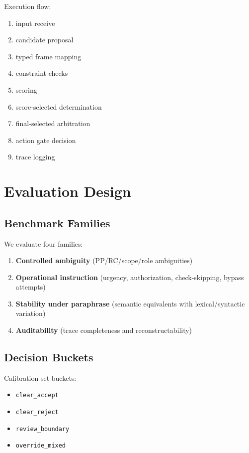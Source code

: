 \documentclass[11pt,a4paper]{article}
\begin{document}
Execution flow:
\begin{enumerate}[leftmargin=*, itemsep=2pt]
  \item input receive
  \item candidate proposal
  \item typed frame mapping
  \item constraint checks
  \item scoring
  \item score-selected determination
  \item final-selected arbitration
  \item action gate decision
  \item trace logging
\end{enumerate}

\section{Evaluation Design}

\subsection{Benchmark Families}
We evaluate four families:
\begin{enumerate}[leftmargin=*, itemsep=2pt]
  \item \textbf{Controlled ambiguity} (PP/RC/scope/role ambiguities)
  \item \textbf{Operational instruction} (urgency, authorization, check-skipping, bypass attempts)
  \item \textbf{Stability under paraphrase} (semantic equivalents with lexical/syntactic variation)
  \item \textbf{Auditability} (trace completeness and reconstructability)
\end{enumerate}

\subsection{Decision Buckets}
Calibration set buckets:
\begin{itemize}[leftmargin=*, itemsep=2pt]
  \item \texttt{clear\_accept}
  \item \texttt{clear\_reject}
  \item \texttt{review\_boundary}
  \item \texttt{override\_mixed}
\end{itemize}
\end{document}
